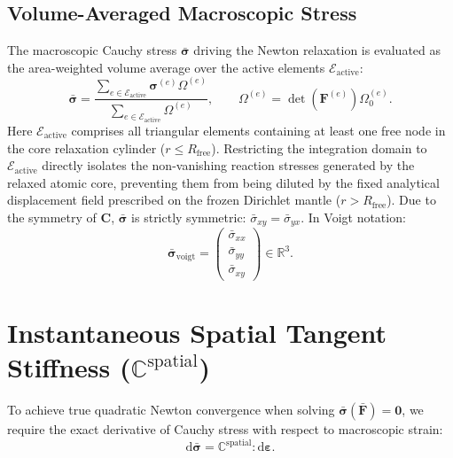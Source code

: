\documentclass[11pt,a4paper]{article}
\begin{document}
\subsection{Volume-Averaged Macroscopic Stress}

The macroscopic Cauchy stress $\bar{\boldsymbol{\sigma}}$ driving the Newton relaxation is evaluated as the area-weighted volume average over the active elements $\mathcal{E}_{\text{active}}$:
\begin{equation}
\label{eq:macro_stress}
\bar{\boldsymbol{\sigma}} = \frac{\sum_{e \in \mathcal{E}_{\text{active}}} \boldsymbol{\sigma}^{(e)} \Omega^{(e)}}{\sum_{e \in \mathcal{E}_{\text{active}}} \Omega^{(e)}}, \qquad \Omega^{(e)} = \det(\mathbf{F}^{(e)}) \Omega_0^{(e)}.
\end{equation}
Here $\mathcal{E}_{\text{active}}$ comprises all triangular elements containing at least one free node in the core relaxation cylinder ($r \le R_{\text{free}}$). Restricting the integration domain to $\mathcal{E}_{\text{active}}$ directly isolates the non-vanishing reaction stresses generated by the relaxed atomic core, preventing them from being diluted by the fixed analytical displacement field prescribed on the frozen Dirichlet mantle ($r > R_{\text{free}}$).
Due to the symmetry of $\mathbf{C}$, $\bar{\boldsymbol{\sigma}}$ is strictly symmetric: $\bar{\sigma}_{xy} = \bar{\sigma}_{yx}$. In Voigt notation:
\begin{equation}
\bar{\boldsymbol{\sigma}}_{\text{voigt}} = \begin{pmatrix} \bar{\sigma}_{xx} \\ \bar{\sigma}_{yy} \\ \bar{\sigma}_{xy} \end{pmatrix} \in \mathbb{R}^3.
\end{equation}

\section{Instantaneous Spatial Tangent Stiffness (\texorpdfstring{$\mathbb{C}^{\text{spatial}}$}{C\_spatial})}

To achieve true quadratic Newton convergence when solving $\bar{\boldsymbol{\sigma}}(\bar{\mathbf{F}}) = \mathbf{0}$, we require the exact derivative of Cauchy stress with respect to macroscopic strain:
\begin{equation}
\mathrm{d}\bar{\boldsymbol{\sigma}} = \mathbb{C}^{\text{spatial}} : \mathrm{d}\boldsymbol{\varepsilon}.
\end{equation}
\end{document}
